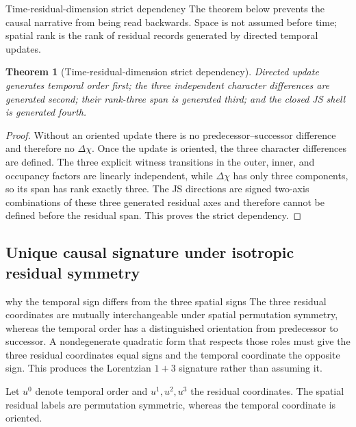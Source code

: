 \documentclass[11pt]{article}
\numberwithin{equation}{section}
\newtheorem{theorem}[definition]{Theorem}
\theoremstyle{remark}
\begin{document}
\begin{proofguide}{Time-residual-dimension strict dependency}
The theorem below prevents the causal narrative from being read backwards. Space is not assumed before time; spatial rank is the rank of residual records generated by directed temporal updates.
\end{proofguide}
\begin{theorem}[Time-residual-dimension strict dependency]
Directed update generates temporal order first; the three independent character differences are generated second; their rank-three span is generated third; and the closed JS shell is generated fourth.
\end{theorem}
\begin{proof}
Without an oriented update there is no predecessor--successor difference and therefore no $\Delta\chi$. Once the update is oriented, the three character differences are defined. The three explicit witness transitions in the outer, inner, and occupancy factors are linearly independent, while $\Delta\chi$ has only three components, so its span has rank exactly three. The JS directions are signed two-axis combinations of these three generated residual axes and therefore cannot be defined before the residual span. This proves the strict dependency.
\end{proof}

\subsection{Unique causal signature under isotropic residual symmetry}
\begin{interpretivebridge}{why the temporal sign differs from the three spatial signs}
The three residual coordinates are mutually interchangeable under spatial permutation symmetry, whereas the temporal order has a distinguished orientation from predecessor to successor. A nondegenerate quadratic form that respects those roles must give the three residual coordinates equal signs and the temporal coordinate the opposite sign. This produces the Lorentzian $1+3$ signature rather than assuming it.
\end{interpretivebridge}

Let $u^0$ denote temporal order and $u^1,u^2,u^3$ the residual coordinates. The spatial residual labels are permutation symmetric, whereas the temporal coordinate is oriented.
\end{document}
